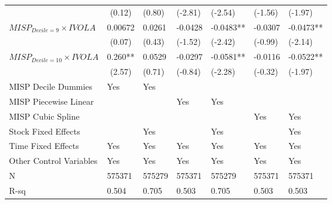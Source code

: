 \begin{tabular}{lllllll}
        & \multicolumn{1}{c}{(0.12)} & (0.80)  & (-2.81) & (-2.54) & (-1.56) & (-1.97) \\
$MISP_{Decile = 9} \times IVOLA$ & \multicolumn{1}{c}{0.00672} & 0.0261  & -0.0428 & -0.0483** & -0.0307 & -0.0473** \\
        & \multicolumn{1}{c}{(0.07)} & (0.43)  & (-1.52) & (-2.42) & (-0.99) & (-2.14) \\
$MISP_{Decile = 10} \times IVOLA$ & \multicolumn{1}{c}{0.260**} & 0.0529  & -0.0297 & -0.0581** & -0.0116 & -0.0522** \\
        & \multicolumn{1}{c}{(2.57)} & (0.71)  & (-0.84) & (-2.28) & (-0.32) & (-1.97) \\
MISP Decile Dummies & Yes     & Yes     &         &         &         &  \\
MISP Piecewise Linear &         &         & Yes     & Yes     &         &  \\
MISP Cubic Spline &         &         &         &         & Yes     & Yes \\
Stock Fixed Effects &         & Yes     &         & Yes     &         & Yes \\
Time Fixed Effects & Yes     & Yes     & Yes     & Yes     & Yes     & Yes \\
Other Control Variables & Yes     & Yes     & Yes     & Yes     & Yes     & Yes \\
N       & 575371  & 575279  & 575371  & 575279  & 575371  & 575371 \\
R-sq    & 0.504   & 0.705   & 0.503   & 0.705   & 0.503   & 0.503 \\
\bottomrule
\end{tabular}%
